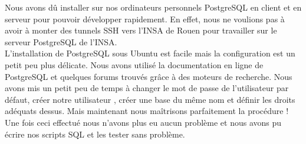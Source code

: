 Nous avons dû installer sur nos ordinateurs personnels PostgreSQL en client et en serveur pour pouvoir développer rapidement. En effet, nous ne voulions pas à avoir à monter des tunnels SSH vers l'INSA de Rouen pour travailler sur le serveur PostgreSQL de l'INSA.\\

L'installation de PostgreSQL sous Ubuntu est facile mais la configuration est un petit peu plus délicate. Nous avons utilisé la documentation en ligne de PostgreSQL et quelques forums trouvés grâce à des moteurs de recherche. Nous avons mis un petit peu de temps à changer le mot de passe de l'utilisateur par défaut, créer notre utilisateur , créer une base du même nom et définir les droits adéquats dessus. Mais maintenant nous maîtrisons parfaitement la procédure ! Une fois ceci effectué nous n'avons plus eu aucun problème et nous avons pu écrire nos scripts SQL et les tester sans problème.